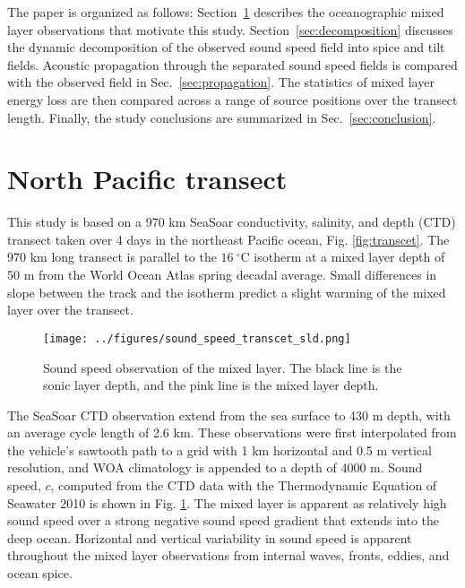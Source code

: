 \documentclass[preprint,NumberedRefs]{JASA}
\begin{document}
The paper is organized as follows: Section~\ref{sec:transcet} describes the oceanographic mixed layer observations that motivate this study. Section~\ref{sec:decomposition} discusses the dynamic decomposition of the observed sound speed field into spice and tilt fields. Acoustic propagation through the separated sound speed fields is compared with the observed field in Sec.~\ref{sec:propagation}. The statistics of mixed layer energy loss are then compared across a range of source positions over the transect length. Finally, the study conclusions are summarized in Sec.~\ref{sec:conclusion}.

\section{North Pacific transect}\label{sec:transcet}

This study is based on a 970 km SeaSoar conductivity, salinity, and depth (CTD) transect taken over 4 days in the northeast Pacific ocean,\citep{cole2010seasonal} Fig. \ref{fig:transcet}. The 970 km long transect is parallel to the $16 \ ^\circ$C isotherm at a mixed layer depth of 50 m from the World Ocean Atlas spring decadal average\citep{WOA}. Small differences in slope between the track and the isotherm predict a slight warming of the mixed layer over the transect.

\begin{figure}
\texttt{[image: ../figures/sound\_speed\_transcet\_sld.png]}
\caption{\label{fig:c_grid}{Sound speed observation of the mixed layer. The black line is the sonic layer depth, and the pink line is the mixed layer depth.}}
\end{figure}

The SeaSoar CTD observation\citep{colosi2020observations} extend from the sea surface to 430 m depth, with an average cycle length of 2.6 km. These observations were first interpolated from the vehicle's sawtooth path to a grid with 1 km horizontal and 0.5 m vertical resolution, and WOA climatology is appended to a depth of 4000 m\citep{WOA}. Sound speed, $c$, computed from the CTD data with the Thermodynamic Equation of Seawater 2010\cite{TEOS-10} is shown in Fig. \ref{fig:c_grid}. The mixed layer is apparent as relatively high sound speed over a strong negative sound speed gradient that extends into the deep ocean. Horizontal and vertical variability in sound speed is apparent throughout the mixed layer observations from internal waves, fronts, eddies, and ocean spice\citep{colosi2020observations}.
\end{document}
